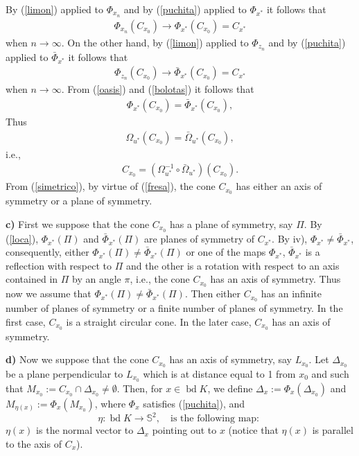 \documentclass[12pt]{amsart}
\newcommand{\bd}{\operatorname*{bd}}
\begin{document}
By (\ref{limon}) applied to $\Phi_{x_n}$ and by (\ref{puchita}) applied to $\Phi_{x^*}$ it follows that
\begin{eqnarray}\label{oasis}
\Phi_{x_n}(C_{x_0})\rightarrow \Phi_{x^*}(C_{x_0})=C_{x^*}
\end{eqnarray}
when $n\rightarrow \infty$. On the other hand, by (\ref{limon}) applied to $\Phi_{z_n}$ and by (\ref{puchita}) applied to $\bar{\Phi}_{x^*}$ it follows that
\begin{eqnarray}\label{bolotas}
\Phi_{z_n}(C_{x_0})\rightarrow \bar{\Phi}_{x^*} (C_{x_0})=C_{x^*}
\end{eqnarray}
when $n\rightarrow \infty$. From (\ref{oasis}) and (\ref{bolotas}) it follows that 
\begin{eqnarray}\label{loca}
\Phi_{x^*}(C_{x_0})=\bar{\Phi}_{x^*} (C_{x_0}),
\end{eqnarray}
Thus
\begin{eqnarray}\label{nina}
\Omega_{u^*}(C_{x_0})=\bar{\Omega}_{u^*} (C_{x_0}),
\end{eqnarray}
i.e.,     
\begin{eqnarray}\label{simetrico}
C_{x_0}=(\Omega_{u^*}^{-1} \circ \bar{\Omega}_{u^*}) (C_{x_0}).
\end{eqnarray} 
From (\ref{simetrico}), by virtue of (\ref{fresa}), the cone $C_{x_0}$ has either an axis of symmetry or a plane of symmetry. 

\textbf{c)} First we suppose that the cone $C_{x_0}$ has a plane of symmetry, say 
$\Pi$. By (\ref{loca}), $\Phi_{x^*}(\Pi)$ and $\bar{\Phi}_{x^*}(\Pi)$ are planes of symmetry of $C_{x^*}$. By iv),  $\Phi_{x^*} \not=\bar{\Phi}_{x^*} $,  consequently, either $\Phi_{x^*}(\Pi)\not= \bar{\Phi}_{x^*}(\Pi)$ or one of the maps $\Phi_{x^*}$, $\bar{\Phi}_{x^*}$ is a reflection with respect to $\Pi$ and the other is a rotation with respect to an axis contained in $\Pi$ by an angle $\pi$, i.e., the cone $C_{x_0}$ has an axis of symmetry. Thus now we assume that $\Phi_{x^*}(\Pi)\not= \bar{\Phi}_{x^*}(\Pi)$. Then either $C_{x_0}$ has an infinite number of planes of symmetry or a finite number of planes of symmetry. In the first case, $C_{x_0}$ is a straight circular cone. In the later case, $C_{x_0}$ has an axis of symmetry.

\textbf{d)} Now we suppose that the cone $C_{x_0}$ has an axis of symmetry, say $L_{x_0}$.  Let $\Delta_{x_0}$ be a plane perpendicular to $L_{x_0}$ which is at distance equal to 1 from $x_0$ and such that $M_{x_{0}}:=C_{x_0}\cap \Delta_{x_0}\not=\emptyset$. Then, for $x\in \bd K$, we define 
$\Delta_x:=\Phi_x(\Delta_{x_0})$ and $M_{\eta(x)}:=\Phi_x(M_{x_{0}})$, where $\Phi_x$ satisfies (\ref{puchita}), and  
  $$\eta: \bd K\to \mathbb S^2, \quad \mbox{is the following map: }$$
 $\eta(x)$ is the normal vector to $\Delta_x$ pointing out to $x$ (notice that $\eta(x)$ is parallel to the axis of $C_{x}$).
  
\end{document}

